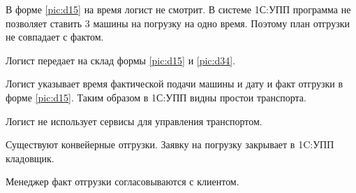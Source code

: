 В форме \ref{pic:d15} на время логист не смотрит.
В системе 1С:УПП программа не  позволяет ставить 3 машины на погрузку на одно время.
Поэтому план отгрузки не совпадает с фактом.

Логист передает на склад формы \ref{pic:d15} и \ref{pic:d34}.


Логист указывает время фактической подачи машины и дату и факт отгрузки в форме \ref{pic:d15}. Таким образом в  1С:УПП видны простои транспорта. 

Логист не использует сервисы для управления транспортом.

Существуют конвейерные отгрузки. 
Заявку на погрузку закрывает в 1C:УПП кладовщик.









Менеджер факт отгрузки согласовываются с клиентом. %




